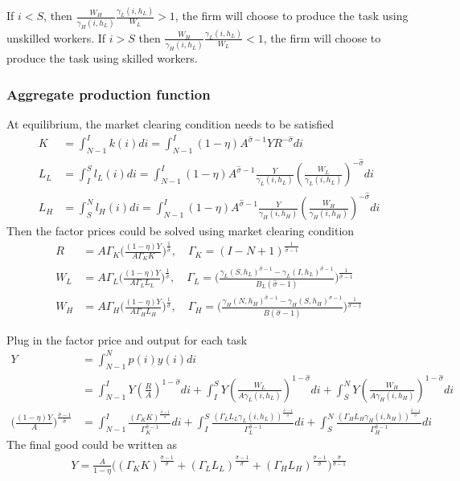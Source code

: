 \documentclass[12pt]{article}
\begin{document}
If $i<S$, then $\frac{W_H}{\gamma_H(i,h_L)}\frac{\gamma_L(i,h_L)}{W_L}>1$, the firm will choose to produce the task using unskilled workers. If $i>S$ then $\frac{W_H}{\gamma_H(i,h_L)}\frac{\gamma_L(i,h_L)}{W_L}<1$, the firm will choose to produce the task using skilled workers.

\subsubsection*{Aggregate production function}
At equilibrium, the market clearing condition needs to be satisfied
\begin{align*}
K &= \int_{N-1}^I k(i)di=  \int_{N-1}^I(1-\eta)A^{\hat{\sigma}-1}YR^{-\hat{\sigma}}di \\
L_L &= \int_{I}^S l_L(i)di=  \int_{N-1}^I (1-\eta)A^{\hat{\sigma}-1}\frac{Y}{\gamma_L(i,h_L)}(\frac{W_L}{\gamma_L(i,h_L)})^{-\hat{\sigma}}di \\
L_H &=\int_{S}^N l_H(i)di=  \int_{N-1}^I (1-\eta)A^{\hat{\sigma}-1}\frac{Y}{\gamma_H(i,h_H)}(\frac{W_H}{\gamma_H(i,h_H)})^{-\hat{\sigma}} di
\end{align*}
Then the factor prices could be solved using market clearing condition 
\begin{align*}
R &=A\Gamma_K \Big(\frac{(1-\eta)Y}{A\Gamma_K K}\Big)^{\frac{1}{\hat{\sigma}}}, \quad \Gamma_K= (I-N+1)^{\frac{1}{\hat{\sigma}-1}}  \\
W_L &= A\Gamma_L\Big(\frac{(1-\eta)Y}{A\Gamma_LL_L}\Big)^{\frac{1}{\hat{\sigma}}}, \quad \Gamma_L=\Big(\frac{\gamma_L(S,h_L)^{\hat{\sigma}-1}-\gamma_L(I,h_L)^{\hat{\sigma}-1}}{B_L(\hat{\sigma}-1)}\Big)^{\frac{1}{\hat{\sigma}-1}}  \\
W_H &=A\Gamma_H\Big(\frac{(1-\eta)Y}{A\Gamma_HL_H}\Big)^{\frac{1}{\hat{\sigma}}}, \quad \Gamma_H = \Big(\frac{\gamma_H(N,h_H)^{\hat{\sigma}-1}-\gamma_H(S,h_H)^{\hat{\sigma}-1}}{B(\hat{\sigma}-1)}\Big)^{\frac{1}{\hat{\sigma}-1}} 
\end{align*}

Plug in the factor price and output for each task 
\begin{align*}
Y &= \int_{N-1}^N p(i)y(i) di \\
	&= \int_{N-1}^I Y(\frac{R}{A})^{1-\hat{\sigma}} di + \int_I^S Y(\frac{W_L}{A\gamma_L(i,h_L)})^{1-\hat{\sigma}} di  + \int_S^N Y(\frac{W_H}{A\gamma_H(i,h_H)})^{1-\hat{\sigma}} di \\
\Big(\frac{(1-\eta)Y}{A} \Big)^{\frac{\hat{\sigma}-1}{\hat{\sigma}}} &= \int_{N-1}^I \frac{(\Gamma_K K)^{\frac{\hat{\sigma}-1}{\hat{\sigma}}}}{\Gamma_K^{\hat{\sigma}-1}} di + \int_I^S \frac{(\Gamma_LL_L \gamma_L(i,h_L))^{\frac{\hat{\sigma}-1}{\hat{\sigma}}}}{\Gamma_L^{\hat{\sigma}-1}} di  + \int_S^N \frac{(\Gamma_HL_H \gamma_H(i,h_H))^{\frac{\hat{\sigma}-1}{\hat{\sigma}}}}{\Gamma_H^{\hat{\sigma}-1}} di 
 \end{align*}
The final good could be written as 
\begin{align*}
Y = \frac{A}{1-\eta}\Big((\Gamma_K K)^{\frac{\hat{\sigma}-1}{\hat{\sigma}}}+(\Gamma_LL_L)^{\frac{\hat{\sigma}-1}{\hat{\sigma}}}+(\Gamma_HL_H)^{\frac{\hat{\sigma}-1}{\hat{\sigma}}}\Big)^{\frac{\hat{\sigma}}{\hat{\sigma}-1}}
 \end{align*}
 
\end{document}
